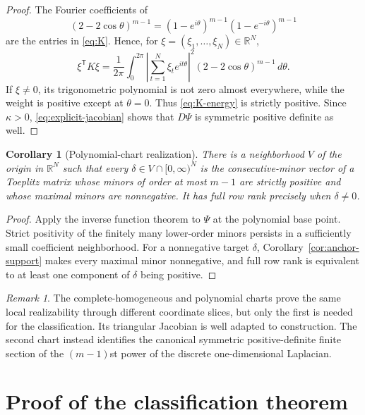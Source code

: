 \documentclass{amsart}
\numberwithin{equation}{section}
\newtheorem{corollary}[theorem]{Corollary}
\theoremstyle{definition}
\theoremstyle{remark}
\newtheorem{remark}[theorem]{Remark}
\newcommand{\RR}{\mathbb R}
\newcommand{\transpose}{\mathsf T}
\begin{document}
\begin{proof}
The Fourier coefficients of
\[
 (2-2\cos\theta)^{m-1}
 =(1-e^{i\theta})^{m-1}(1-e^{-i\theta})^{m-1}
\]
are the entries in \eqref{eq:K}.  Hence, for $\xi=(\xi_1,\ldots,\xi_N)\in\RR^N$,
\begin{equation}\label{eq:K-energy}
 \xi^{\transpose}K\xi
 =\frac1{2\pi}\int_0^{2\pi}
 \left|\sum_{t=1}^N\xi_te^{it\theta}\right|^2
 (2-2\cos\theta)^{m-1}\,d\theta.
\end{equation}
If $\xi\ne0$, its trigonometric polynomial is not zero almost everywhere, while the weight is positive except at $\theta=0$.  Thus \eqref{eq:K-energy} is strictly positive.  Since $\kappa>0$, \eqref{eq:explicit-jacobian} shows that $D\Psi$ is symmetric positive definite as well.
\end{proof}

\begin{corollary}[Polynomial-chart realization]\label{cor:polynomial-realization}
There is a neighborhood $V$ of the origin in $\RR^N$ such that every $\delta\in V\cap[0,\infty)^N$ is the consecutive-minor vector of a Toeplitz matrix whose minors of order at most $m-1$ are strictly positive and whose maximal minors are nonnegative.  It has full row rank precisely when $\delta\ne0$.
\end{corollary}

\begin{proof}
Apply the inverse function theorem to $\Psi$ at the polynomial base point.  Strict positivity of the finitely many lower-order minors persists in a sufficiently small coefficient neighborhood.  For a nonnegative target $\delta$, Corollary~\ref{cor:anchor-support} makes every maximal minor nonnegative, and full row rank is equivalent to at least one component of $\delta$ being positive.
\end{proof}

\begin{remark}
The complete-homogeneous and polynomial charts prove the same local realizability through different coordinate slices, but only the first is needed for the classification.  Its triangular Jacobian is well adapted to construction.  The second chart instead identifies the canonical symmetric positive-definite finite section of the $(m-1)$st power of the discrete one-dimensional Laplacian.
\end{remark}


\section{Proof of the classification theorem}\label{sec:assembly}
\end{document}
